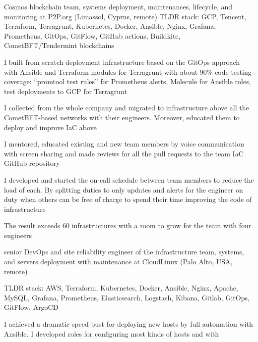 {\begin{list}{●}
          Cosmos blockchain team, systems deployment, maintenances, lifecycle, and
          monitoring at P2P.org (Limassol, Cyprus, remote)
          \PositonHead{}
          TLDR stack: GCP, Tencent, Terraform, Terragrunt, Kubernetes, Docker, Ansible,
          Nginx, Grafana, Prometheus, GitOps, GitFlow, GitHub actions, Buildkite,
          CometBFT/Tendermint blockchains
    \item I built from scratch deployment infrastructure based on the GitOps approach
          with Ansible and Terraform modules for Terragrunt with about 90\% code testing
          coverage: “promtool test rules” for Prometheus alerts, Molecule for Ansible
          roles, test deployments to GCP for Terragrunt
    \item I collected from the whole company and migrated to infrastructure above all
          the CometBFT-based networks with their engineers. Moreover, educated them to
          deploy and improve IaC above
    \item I mentored, educated existing and new team members by voice communication
          with screen sharing and made reviews for all the pull requests to the team IaC
          GitHub repository
    \item I developed and started the on-call schedule between team members to reduce
          the load of each. By splitting duties to only updates and alerts for the
          engineer on duty when others can be free of charge to spend their time
          improving the code of infrastructure
    \item The result exceeds 60 infrastructures with a room to grow for the team with
          four engineers
          \PositonTail{}
    \item {}senior DevOps and site reliability engineer
          of the infrastructure team, systems, and servers deployment with maintenance at
          CloudLinux (Palo Alto, USA, remote)
          \PositonHead{}
    \item TLDR stack: AWS, Terraform, Kubernetes, Docker, Ansible, Nginx, Apache, MySQL,
          Grafana, Prometheus, Elasticsearch, Logstash, Kibana, Gitlab, GitOps, GitFlow,
          ArgoCD
    \item I achieved a dramatic speed bust for deploying new hosts by full automation
          with Ansible. I developed roles for configuring most kinds of hosts and with

\end{list}}
